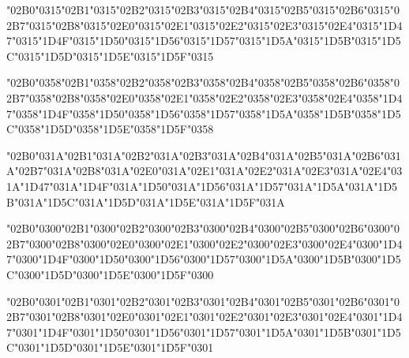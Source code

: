 \documentclass[landscape]{article}
\newcommand{\gs}{\hspace{0.5mm}}	%
\begin{document}
\char"02B0\char"0315\gs \char"02B1\char"0315\gs \char"02B2\char"0315\gs \char"02B3\char"0315\gs \char"02B4\char"0315\gs \char"02B5\char"0315\gs \char"02B6\char"0315\gs \char"02B7\char"0315\gs \char"02B8\char"0315\gs \char"02E0\char"0315\gs \char"02E1\char"0315\gs \char"02E2\char"0315\gs \char"02E3\char"0315\gs \char"02E4\char"0315\gs \char"1D47\char"0315\gs \char"1D4F\char"0315\gs \char"1D50\char"0315\gs \char"1D56\char"0315\gs \char"1D57\char"0315\gs \char"1D5A\char"0315\gs \char"1D5B\char"0315\gs \char"1D5C\char"0315\gs \char"1D5D\char"0315\gs \char"1D5E\char"0315\gs \char"1D5F\char"0315

\char"02B0\char"0358\gs \char"02B1\char"0358\gs \char"02B2\char"0358\gs \char"02B3\char"0358\gs \char"02B4\char"0358\gs \char"02B5\char"0358\gs \char"02B6\char"0358\gs \char"02B7\char"0358\gs \char"02B8\char"0358\gs \char"02E0\char"0358\gs \char"02E1\char"0358\gs \char"02E2\char"0358\gs \char"02E3\char"0358\gs \char"02E4\char"0358\gs \char"1D47\char"0358\gs \char"1D4F\char"0358\gs \char"1D50\char"0358\gs \char"1D56\char"0358\gs \char"1D57\char"0358\gs \char"1D5A\char"0358\gs \char"1D5B\char"0358\gs \char"1D5C\char"0358\gs \char"1D5D\char"0358\gs \char"1D5E\char"0358\gs \char"1D5F\char"0358

\char"02B0\char"031A\gs \char"02B1\char"031A\gs \char"02B2\char"031A\gs \char"02B3\char"031A\gs \char"02B4\char"031A\gs \char"02B5\char"031A\gs \char"02B6\char"031A\gs \char"02B7\char"031A\gs \char"02B8\char"031A\gs \char"02E0\char"031A\gs \char"02E1\char"031A\gs \char"02E2\char"031A\gs \char"02E3\char"031A\gs \char"02E4\char"031A\gs \char"1D47\char"031A\gs \char"1D4F\char"031A\gs \char"1D50\char"031A\gs \char"1D56\char"031A\gs \char"1D57\char"031A\gs \char"1D5A\char"031A\gs \char"1D5B\char"031A\gs \char"1D5C\char"031A\gs \char"1D5D\char"031A\gs \char"1D5E\char"031A\gs \char"1D5F\char"031A

\char"02B0\char"0300\gs \char"02B1\char"0300\gs \char"02B2\char"0300\gs \char"02B3\char"0300\gs \char"02B4\char"0300\gs \char"02B5\char"0300\gs \char"02B6\char"0300\gs \char"02B7\char"0300\gs \char"02B8\char"0300\gs \char"02E0\char"0300\gs \char"02E1\char"0300\gs \char"02E2\char"0300\gs \char"02E3\char"0300\gs \char"02E4\char"0300\gs \char"1D47\char"0300\gs \char"1D4F\char"0300\gs \char"1D50\char"0300\gs \char"1D56\char"0300\gs \char"1D57\char"0300\gs \char"1D5A\char"0300\gs \char"1D5B\char"0300\gs \char"1D5C\char"0300\gs \char"1D5D\char"0300\gs \char"1D5E\char"0300\gs \char"1D5F\char"0300

\char"02B0\char"0301\gs \char"02B1\char"0301\gs \char"02B2\char"0301\gs \char"02B3\char"0301\gs \char"02B4\char"0301\gs \char"02B5\char"0301\gs \char"02B6\char"0301\gs \char"02B7\char"0301\gs \char"02B8\char"0301\gs \char"02E0\char"0301\gs \char"02E1\char"0301\gs \char"02E2\char"0301\gs \char"02E3\char"0301\gs \char"02E4\char"0301\gs \char"1D47\char"0301\gs \char"1D4F\char"0301\gs \char"1D50\char"0301\gs \char"1D56\char"0301\gs \char"1D57\char"0301\gs \char"1D5A\char"0301\gs \char"1D5B\char"0301\gs \char"1D5C\char"0301\gs \char"1D5D\char"0301\gs \char"1D5E\char"0301\gs \char"1D5F\char"0301
\end{document}
